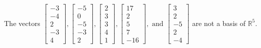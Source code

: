 \begin{exercise}
\begin{exerciseStatement}
  \end{exerciseStatement}
  \begin{exerciseAnswer}
   The vectors \(\left[\begin{array}{r}
-3 \\
-4 \\
2 \\
-3 \\
4
\end{array}\right] , \left[\begin{array}{r}
-5 \\
0 \\
-5 \\
-3 \\
2
\end{array}\right] , \left[\begin{array}{r}
2 \\
3 \\
3 \\
4 \\
1
\end{array}\right] , \left[\begin{array}{r}
17 \\
2 \\
5 \\
7 \\
-16
\end{array}\right] , \text{ and } \left[\begin{array}{r}
3 \\
2 \\
-5 \\
2 \\
-4
\end{array}\right]\) 
  	 are not  a basis of \(\mathbb{R}^5\).
  


  \end{exerciseAnswer}
\end{exercise}
